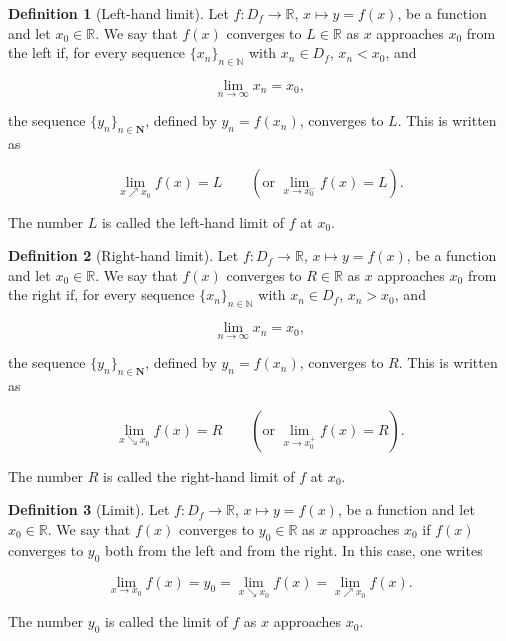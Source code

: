 \documentclass{article}
\theoremstyle{definition}
\newtheorem{definition}{Definition}
\theoremstyle{Solution}
\begin{document}
\begin{definition}[Left-hand limit]
Let $f:D_f \rightarrow \mathbb{R}$, $x \mapsto y=f(x)$, be a function and let $x_0 \in \mathbb{R}$. We say that $f(x)$ converges to $L \in \mathbb{R}$ as $x$ approaches $x_0$ from the left if, for every sequence $\{x_n\}_{n \in \mathbb{N}}$ with $x_n \in D_f$, $x_n < x_0$, and

\begin{equation}
	\lim_{n \rightarrow \infty} x_n = x_0,
\end{equation}

the sequence $\{y_n\}_{n \in \mathbf{N}}$, defined by $y_n=f(x_n)$, converges to $L$. This is written as

\begin{equation}
	\lim_{x \nearrow x_0} f(x)=L
	\qquad
	\left(\text{or } \lim_{x \rightarrow x_0^-}f(x)=L\right).
\end{equation}

The number $L$ is called the left-hand limit of $f$ at $x_0$.
\end{definition}

\begin{definition}[Right-hand limit]
Let $f:D_f \rightarrow \mathbb{R}$, $x \mapsto y=f(x)$, be a function and let $x_0 \in \mathbb{R}$. We say that $f(x)$ converges to $R \in \mathbb{R}$ as $x$ approaches $x_0$ from the right if, for every sequence $\{x_n\}_{n \in \mathbb{N}}$ with $x_n \in D_f$, $x_n > x_0$, and

\begin{equation}
	\lim_{n \rightarrow \infty} x_n = x_0,
\end{equation}

the sequence $\{y_n\}_{n \in \mathbf{N}}$, defined by $y_n=f(x_n)$, converges to $R$. This is written as

\begin{equation}
	\lim_{x \searrow x_0} f(x)=R
	\qquad
	\left(\text{or } \lim_{x \rightarrow x_0^+}f(x)=R\right).
\end{equation}

The number $R$ is called the right-hand limit of $f$ at $x_0$.
\end{definition}

\begin{definition}[Limit]
Let $f:D_f \rightarrow \mathbb{R}$, $x \mapsto y=f(x)$, be a function and let $x_0 \in \mathbb{R}$. We say that $f(x)$ converges to $y_0 \in \mathbb{R}$ as $x$ approaches $x_0$ if $f(x)$ converges to $y_0$ both from the left and from the right. In this case, one writes

\begin{equation}
	\lim_{x \rightarrow x_0}f(x)=y_0
	=
	\lim_{x \searrow x_0}f(x)
	=
	\lim_{x \nearrow x_0}f(x).
\end{equation}

The number $y_0$ is called the limit of $f$ as $x$ approaches $x_0$.
\end{definition}
\end{document}
